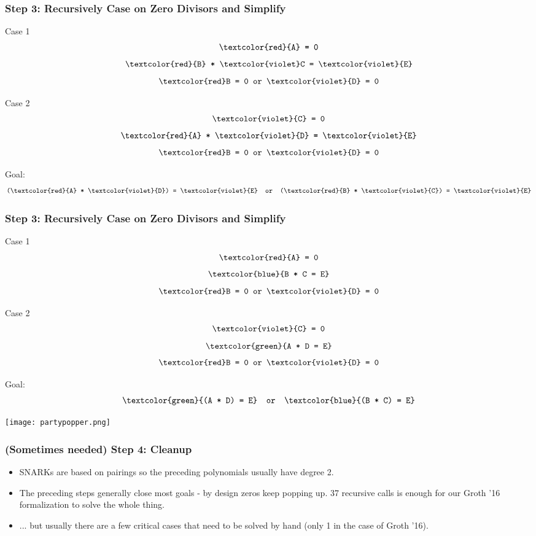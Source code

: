 \documentclass{beamer}
\begin{document}
\begin{frame}

    \frametitle{Step 3: Recursively Case on Zero Divisors and Simplify}

    \parbox[t]{5cm}{
    \centering
    Case 1
        $$ \texttt{\textcolor{red}{A} = 0}$$
        $$ \texttt{\textcolor{red}{B} * \textcolor{violet}C = \textcolor{violet}{E}} $$
        $$ \texttt{\textcolor{red}B = 0 or \textcolor{violet}{D} = 0}  $$ }%
    \hspace{1cm}%
    \parbox[t]{5cm}{
    \centering
    Case 2
        $$ \texttt{\textcolor{violet}{C} = 0}$$
        $$ \texttt{\textcolor{red}{A} * \textcolor{violet}{D} = \textcolor{violet}{E}} $$
        $$ \texttt{\textcolor{red}B = 0 or \textcolor{violet}{D} = 0}  $$ }%


    Goal:
    $$\texttt{(\textcolor{red}{A} * \textcolor{violet}{D}) = \textcolor{violet}{E}  \text{ or } (\textcolor{red}{B} * \textcolor{violet}{C}) = \textcolor{violet}{E}}$$

\end{frame}

\begin{frame}

    \frametitle{Step 3: Recursively Case on Zero Divisors and Simplify}

    \parbox[t]{5cm}{
    \centering
    Case 1
        $$ \texttt{\textcolor{red}{A} = 0}$$
        $$ \texttt{\textcolor{blue}{{B} * C = E}} $$
        $$ \texttt{\textcolor{red}B = 0 or \textcolor{violet}{D} = 0}  $$ }%
    \hspace{1cm}%
    \parbox[t]{5cm}{
    \centering
    Case 2
        $$ \texttt{\textcolor{violet}{C} = 0}$$
        $$ \texttt{\textcolor{green}{{A} * D = E}} $$
        $$ \texttt{\textcolor{red}B = 0 or \textcolor{violet}{D} = 0}  $$ }%


    Goal:
    $$\texttt{\textcolor{green}{({A} * {D}) = {E}}  \text{ or } \textcolor{blue}{({B} * {C}) = {E}}}$$
    \begin{center}
        \texttt{[image: partypopper.png]}        
    \end{center}

\end{frame}

\begin{frame}

    \frametitle{(Sometimes needed) Step 4: Cleanup}

    \begin{itemize}
        \item SNARKs are based on pairings so the preceding polynomials usually have degree 2.
        \item The preceding steps generally close most goals - by design zeros keep popping up. 37 recursive calls is enough for our Groth '16 formalization to solve the whole thing.
        \item ... but usually there are a few critical cases that need to be solved by hand (only 1 in the case of Groth '16).
    \end{itemize}

\end{frame}
\end{document}
